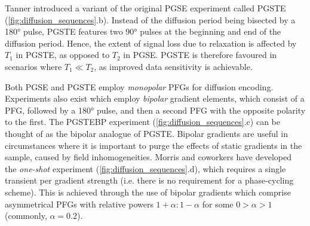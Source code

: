 Tanner introduced a variant of the original \ac{PGSE} experiment called
\ac{PGSTE}\cite{Tanner1970} (\cref{fig:diffusion_sequences}.b). Instead
of the diffusion period being bisected by a
\ang{180} pulse, \ac{PGSTE} features two \ang{90} pulses at the beginning and
end of the diffusion period.
Hence, the extent of signal loss due to relaxation is affected by $T_1$ in
\ac{PGSTE}, as opposed to $T_2$ in \ac{PGSE}. \ac{PGSTE} is therefore favoured
in scenarios where $T_1 \ll T_2$, as improved data sensitivity is achievable.

Both \ac{PGSE} and \ac{PGSTE} employ \emph{monopolar} \acp{PFG} for diffusion
encoding.
Experiments also exist which employ
\emph{bipolar} gradient elements, which consist of a
\ac{PFG}, followed by a \ang{180} pulse, and then a second \ac{PFG} with the
opposite polarity to the first\cite{Cotts1989,Wu1995}. The \ac{PGSTEBP} experiment
(\cref{fig:diffusion_sequences}.c) can be thought of as the bipolar analogue of
\ac{PGSTE}.
Bipolar gradients are useful in circumstances where it is important to purge
the effects of static gradients in the sample, caused by field inhomogeneities.
Morris and coworkers have developed the \emph{one-shot}
experiment\cite{Pelta2002} (\cref{fig:diffusion_sequences}.d), which requires a
single transient per gradient strength (i.e. there is no requirement for a
phase-cycling scheme).  This is achieved through the use of bipolar gradients
which comprise asymmetrical \acp{PFG} with relative powers $1 + \alpha : 1 -
\alpha$ for some $ 0 > \alpha > 1$ (commonly, $\alpha=0.2$).

